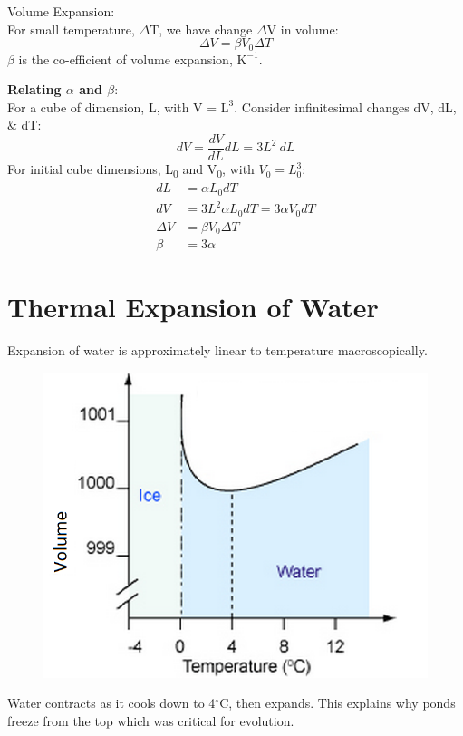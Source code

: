 \documentclass[a4paper, 11pt, normalem]{report}
\begin{document}
Volume Expansion:\\
For small temperature, $\Delta$T, we have change $\Delta$V in volume:
\begin{equation}
    {\Delta}V = {\beta}V_{0}{\Delta}T
\end{equation}
$\beta$ is the co-efficient of volume expansion, $\text{K}^{-1}$.

\textbf{Relating ${\alpha}$ and ${\beta}$}:\\
For a cube of dimension, L, with V = $\text{L}^{3}$.
Consider infinitesimal changes dV, dL, \& dT:
\begin{equation}
	dV = \dfrac{dV}{dL}dL = 3L^{2}~dL
\end{equation}
For initial cube dimensions, L\textsubscript{0} and V\textsubscript{0}, with $V_{0} = L_{0}^{3}$:
\begin{align}
    dL &= {\alpha}L_{0}dT \\
    dV &= 3L^{2}{\alpha}L_{0}dT = 3{\alpha}V_{0}dT \\
    {\Delta}V &= {\beta}V_{0}{\Delta}T \\
    \beta &= 3\alpha
\end{align}

\section{Thermal Expansion of Water}
Expansion of water is approximately linear to temperature macroscopically.
\begin{figure}[H]
    \centering
    \includegraphics[scale=0.4]{water.png}
\end{figure}
Water contracts as it cools down to 4{$^\circ$}C, then expands.
This explains why ponds freeze from the top which was critical for evolution.
\end{document}

